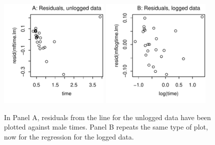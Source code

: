 \documentclass[12pt, a4paper,  BCOR=8.25mm, DIV=15]{scrartcl}\usepackage[]{graphicx}\usepackage[]{color}
\newenvironment{knitrout}{}{} %
\begin{document}
\begin{figure}[H]
\begin{knitrout}
\color{fgcolor}

{\centering \includegraphics[width=0.47\textwidth]{figs/reg-fig11_6e-1} 
\includegraphics[width=0.47\textwidth]{figs/reg-fig11_6e-2} 

}



\end{knitrout}
\caption{In Panel A, residuals from the line for the unlogged data
  have been plotted against male times.  Panel B repeats the same
  type of plot, now for the regression for the logged data.\label{fig:to-horiz}}
\end{figure}
\end{document}
